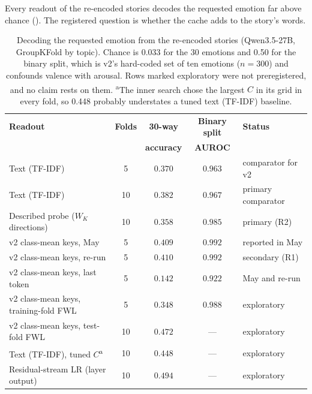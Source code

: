 Every readout of the re-encoded stories decodes the requested emotion far above chance (). The registered question is whether the cache adds to the story's words.

\begin{table}[H]
\centering
\caption{Decoding the requested emotion from the re-encoded stories (Qwen3.5-27B, GroupKFold by topic). Chance is 0.033 for the 30 emotions and 0.50 for the binary split, which is v2's hard-coded set of ten emotions ($n = 300$) and confounds valence with arousal. Rows marked exploratory were not preregistered, and no claim rests on them. \textsuperscript{a}The inner search chose the largest $C$ in its grid in every fold, so 0.448 probably understates a tuned text (TF-IDF) baseline.}
\label{tab:wk_probe}
\small
\begin{tabular}{lcccl}
\toprule
\textbf{Readout} & \textbf{Folds} & \textbf{30-way} & \textbf{Binary split} & \textbf{Status} \\
 & & \textbf{accuracy} & \textbf{AUROC} & \\
\midrule
Text (TF-IDF) & 5 & $0.370$ & $0.963$ & comparator for v2 \\
Text (TF-IDF) & 10 & $0.382$ & $0.967$ & primary comparator \\
Described probe ($W_K$ directions) & 10 & $0.358$ & $0.985$ & primary (R2) \\
v2 class-mean keys, May & 5 & $0.409$ & $0.992$ & reported in May \\
v2 class-mean keys, re-run & 5 & $0.410$ & $0.992$ & secondary (R1) \\
v2 class-mean keys, last token & 5 & $0.142$ & $0.922$ & May and re-run \\
\midrule
v2 class-mean keys, training-fold FWL & 5 & $0.348$ & $0.988$ & exploratory \\
v2 class-mean keys, test-fold FWL & 10 & $0.472$ & --- & exploratory \\
Text (TF-IDF), tuned $C$\textsuperscript{a} & 10 & $0.448$ & --- & exploratory \\
Residual-stream LR (layer output) & 10 & $0.494$ & --- & exploratory \\
\bottomrule
\end{tabular}
\end{table}

